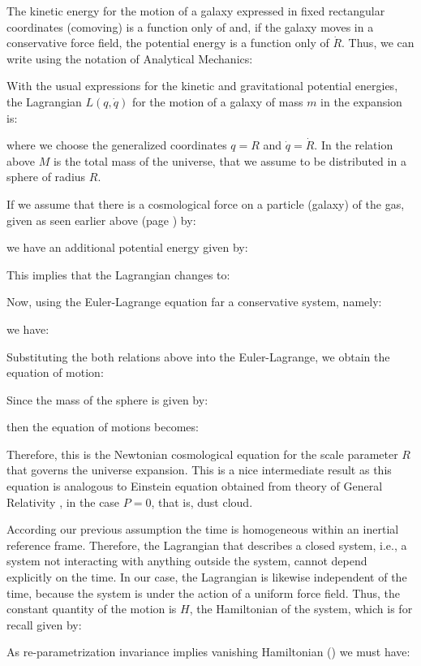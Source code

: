 	The kinetic energy for the motion of a galaxy expressed in fixed rectangular coordinates (comoving) is a function only of  and, if the galaxy moves in a conservative force field, the potential energy is a function only of $\dot{R}$. Thus, we can write using the notation of Analytical Mechanics:
	
	With the usual expressions for the kinetic and gravitational potential energies, the Lagrangian $L(q,\dot{q})$ for the motion of a galaxy of mass $m$ in the expansion is:
	
	where we choose the generalized coordinates $q=R$ and $\dot{q}=\dot{R}$. In the relation above $M$ is the total mass of the universe, that we assume to be distributed in a sphere of radius $R$.
	
	If we assume that there is a cosmological force on a particle (galaxy) of the gas, given as seen earlier above (page \pageref{cosmological repuslive force}) by:
	
	we have an additional potential energy given by:
	
	This implies that the Lagrangian changes to:
	
	Now, using the Euler-Lagrange equation far a conservative system, namely:
	
	we have:
	
	Substituting the both relations above into the Euler-Lagrange, we obtain the equation of motion:
	
	Since the mass of the sphere is given by:
	
	then the equation of motions becomes:
	
	Therefore, this is the Newtonian cosmological equation for the scale parameter $R$ that governs the universe expansion. This is a nice intermediate result as this equation is analogous to Einstein equation obtained from theory of General Relativity , in the case $P=0$, that is, dust cloud.
	
	According our previous assumption the time is homogeneous within an inertial reference frame. Therefore, the Lagrangian that describes a closed system, i.e., a system not interacting with anything outside the system, cannot depend explicitly on the time. In our case, the Lagrangian is likewise independent of the time, because the system is under the action of a uniform force field. Thus, the constant quantity of the motion is $H$, the Hamiltonian of the system, which is for recall given by:
	
	As re-parametrization invariance implies vanishing Hamiltonian () we must have:
	
